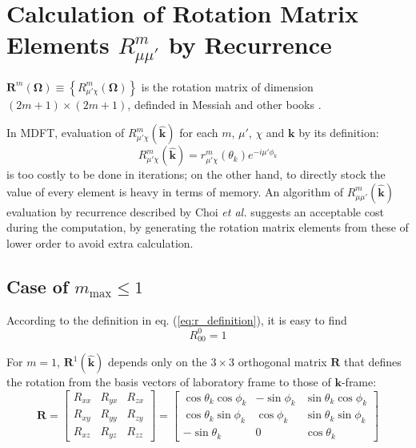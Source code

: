 
\chapter{Calculation of Rotation Matrix Elements $R_{\mu\mu'}^{m}$ by Recurrence\label{chpt:rotM-by-recurrence}}

$\mathbf{R}^{m}(\mathbf{\Omega})\equiv\left\{ R_{\mu'\chi}^{m}(\mathbf{\Omega})\right\} $
is the rotation matrix of dimension $\left(2m+1\right)\times\left(2m+1\right)$,
definded in Messiah and other books \citep{Edmonds,Gray-Gubbins,Messiah}.

In MDFT, evaluation of $R_{\mu'\chi}^{m}(\hat{\mathbf{k}})$ for each
$m$, $\mu'$, $\chi$ and $\mathbf{k}$ by its definition:
\begin{equation}
R_{\mu'\chi}^{m}(\hat{\mathbf{k}})=r_{\mu'\chi}^{m}(\theta_{k})e^{-i\mu'\phi_{k}}\label{eq:r_definition}
\end{equation}
is too costly to be done in iterations; on the other hand, to directly
stock the value of every element is heavy in terms of memory. An algorithm
of $R_{\mu\mu'}^{m}(\hat{\mathbf{k}})$ evaluation by recurrence described
by Choi \textit{et al.} \citep{Choi_1999} suggests an acceptable
cost during the computation, by generating the rotation matrix elements
from these of lower order to avoid extra calculation.


\section{Case of $m_{\mathrm{max}}\leq1$}

According to the definition in eq. (\ref{eq:r_definition}), it is
easy to find
\begin{equation}
R_{00}^{0}=1
\end{equation}


For $m=1$, $\mathbf{R}^{1}(\hat{\mathbf{k}})$ depends only on the
$3\times3$ orthogonal matrix $\mathbf{R}$ that defines the rotation
from the basis vectors of laboratory frame to those of $\mathbf{k}$-frame:
\begin{equation}
\mathbf{R}=\left[\begin{array}{ccc}
R_{xx} & R_{yx} & R_{zx}\\
R_{xy} & R_{yy} & R_{zy}\\
R_{xz} & R_{yz} & R_{zz}
\end{array}\right]=\left[\begin{array}{ccc}
\cos\theta_{k}\cos\phi_{k} & -\sin\phi_{k} & \sin\theta_{k}\cos\phi_{k}\\
\cos\theta_{k}\sin\phi_{k} & \cos\phi_{k} & \sin\theta_{k}\sin\phi_{k}\\
-\sin\theta_{k} & 0 & \cos\theta_{k}
\end{array}\right]
\end{equation}


